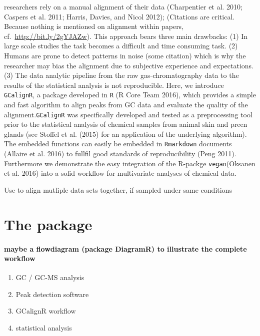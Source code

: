 \documentclass[]{article}
\providecommand{\tightlist}{%
  \setlength{\itemsep}{0pt}\setlength{\parskip}{0pt}}
\let\oldparagraph\paragraph
\renewcommand{\paragraph}[1]{\oldparagraph{#1}\mbox{}}
\begin{document}
researchers rely on a manual alignment of their data (Charpentier et al.
2010; Caspers et al. 2011; Harris, Davies, and Nicol 2012); (Citations
are critical. Because nothing is mentioned on alignment within papers,
cf.~\url{http://bit.ly/2gYJAZw}). This approach bears three main
drawbacks: (1) In large scale studies the task becomes a difficult and
time consuming task. (2) Humans are prone to detect patterns in noise
(some citation) which is why the researcher may bias the alignment due
to subjective experience and expectations. (3) The data analytic
pipeline from the raw gas-chromatography data to the results of the
statistical analysis is not reproducible. Here, we introduce
\texttt{GCalignR}, a package developed in \texttt{R} (R Core Team 2016),
which provides a simple and fast algorithm to align peaks from GC data
and evaluate the quality of the alignment.\texttt{GCalignR} was
specifically developed and tested as a preprocessing tool prior to the
statistical analysis of chemical samples from animal skin and preen
glands (see Stoffel et al. (2015) for an application of the underlying
algorithm). The embedded functions can easily be embedded in
\texttt{Rmarkdown} documents (Allaire et al. 2016) to fullfil good
standards of reproducibility (Peng 2011). Furthermore we demonstrate the
easy integration of the R-packge \texttt{vegan}(Oksanen et al. 2016)
into a solid workflow for multivariate analyses of chemical data.

Use to align mutliple data sets together, if sampled under same
conditions

\section{The package}\label{the-package}

\paragraph{maybe a flowdiagram (package DiagramR) to illustrate the
complete
workflow}\label{maybe-a-flowdiagram-package-diagramr-to-illustrate-the-complete-workflow}

\begin{enumerate}
\def\labelenumi{\arabic{enumi}.}
\tightlist
\item
  GC / GC-MS analysis
\item
  Peak detection software
\item
  GCalignR workflow
\item
  statistical analysis
\end{enumerate}
\end{document}
